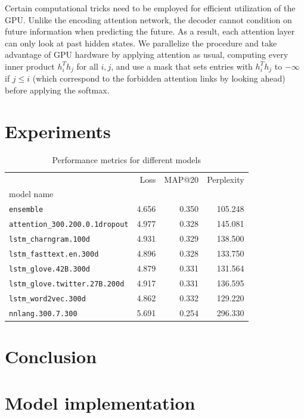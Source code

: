 \documentclass[12pt]{article}
\begin{document}
Certain computational tricks need to be employed for efficient utilization of
the GPU. Unlike the encoding attention network, the decoder cannot condition on
future information when predicting the future. As a result, each attention layer
can only look at past hidden states. We parallelize the procedure and take
advantage of GPU hardware by applying attention as usual, computing every
inner product $h_i^T h_j$ for all $i,j$, and use a mask that sets entries with
$h_i^T h_j$
to $-\infty$ if $j \le i$ (which correspond to the forbidden attention
links by looking ahead) before applying the softmax.

\section{Experiments}

\begin{table}[h]
\centering
\begin{tabular}{lrrr}
\toprule
{}                                     & Loss  & MAP@20 & Perplexity \\
model name                             &       &        & \\
\midrule
\texttt{ensemble}                      & 4.656 & 0.350  & 105.248 \\
\texttt{attention\_300.200.0.1dropout} & 4.977 & 0.328  & 145.081 \\
\texttt{lstm\_charngram.100d}          & 4.931 & 0.329  & 138.500 \\
\texttt{lstm\_fasttext.en.300d}        & 4.896 & 0.328  & 133.750 \\
\texttt{lstm\_glove.42B.300d}          & 4.879 & 0.331  & 131.564 \\
\texttt{lstm\_glove.twitter.27B.200d}  & 4.917 & 0.331  & 136.595 \\
\texttt{lstm\_word2vec.300d}           & 4.862 & 0.332  & 129.220 \\
\texttt{nnlang.300.7.300}              & 5.691 & 0.254  & 296.330 \\
\bottomrule
\end{tabular}
\caption{Performance metrics for different models}
\label{table:performance}
\end{table}

\section{Conclusion}





\appendix
\section{Model implementation}






\end{document}
